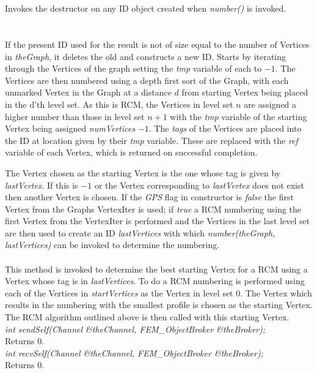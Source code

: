   \\
  \\
Invokes the destructor on any ID object created when {\em number()} is
invoked. \\

  \\
\\
If the present ID used for the result is not of size equal to the
number of Vertices in {\em theGraph}, it deletes the old and
constructs a new ID. Starts by iterating through the Vertices of the
graph setting the {\em tmp} variable of each to $-1$. The Vertices are
then numbered using a depth first sort of the Graph, with each
unmarked Vertex in the Graph at a distance $d$ from starting Vertex
being placed in the d'th level set. As this is RCM, the Vertices in
level set $n$ are assigned a higher number than those in level set
$n+1$ with the {\em tmp} variable of the starting Vertex being
assigned {\em numVertices} $-1$. The {\em tags} of the Vertices are
placed into the ID at location given by their {\em tmp} variable. These
are replaced with the {\em ref} variable of each Vertex, which is
returned on successful completion. 


The Vertex chosen as the starting Vertex is the one whose tag is given
by {\em lastVertex}. If this is $-1$ or the Vertex corresponding to
{\em lastVertex} does not exist then another Vertex is chosen. If the
{\em GPS} flag in constructor is {\em false} the first Vertex from the
Graphs VertexIter is used; if {\em true} a RCM numbering using the
first Vertex from the VertexIter is performed and the Vertices in the
last level set are then used to create an ID {\em lastVertices} with
which {\em number(theGraph, lastVertices)} can be invoked to determine
the numbering. \\


\\
This method is invoked to determine the best starting Vertex for a RCM
using a Vertex whose tag is in {\em lastVertices}. To do a RCM
numbering is performed using each of the Vertices in {\em
startVertices} as the Vertex in level set $0$. The Vertex which
results in the numbering with the smallest profile is chosen as 
the starting Vertex. The RCM algorithm outlined above is then called
with this starting Vertex. \\

{\em int sendSelf(Channel \&theChannel,
FEM\_ObjectBroker \&theBroker);} \\
Returns $0$. \\

{\em int recvSelf(Channel \&theChannel,
FEM\_ObjectBroker \&theBroker); } \\
Returns $0$.

